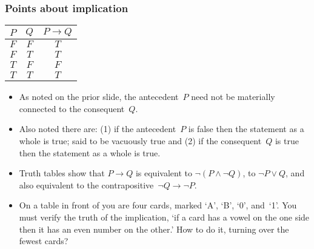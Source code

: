 \documentclass[10pt,t]{beamer}
\begin{document}
\begin{frame}\vspace*{-1ex}
\frametitle{Points about implication}
\begin{center}
  \begin{tabular}{cc|c}
    $P$  &$Q$  &$P \rightarrow Q$  \\ \hline
    $F$  &$F$  &$T$          \\
    $F$  &$T$  &$T$          \\
    $T$  &$F$  &$F$          \\
    $T$  &$T$  &$T$     
  \end{tabular}
\end{center}
\begin{itemize}
\item As noted on the prior slide, 
  the antecedent~$P$ need not be materially connected to the 
  consequent~$Q$.
\pause
\item Also noted there are:
  (1) if the antecedent~$P$ is false then the statement as a whole is true; 
  said to be \alert{vacuously true}
  and (2) if the consequent~$Q$ is true then the statement as a whole is true.
\pause
\item Truth tables show that $P\rightarrow Q$
  is equivalent to $\neg(P\wedge \neg Q)$, 
  to $\neg P\vee Q$,
  and also equivalent to the \alert{contrapositive}~$\neg Q\rightarrow \neg P$.
\pause
\item 
  On a table in front of you are four cards, 
  marked `A', `B', `0', and~`1'.
  You must verify the truth of the implication, 
  `if a card has a vowel on the one side 
  then it has an even number on the other.'  
  How to do it, turning over the fewest cards?
\end{itemize}
\end{frame}
\end{document}
